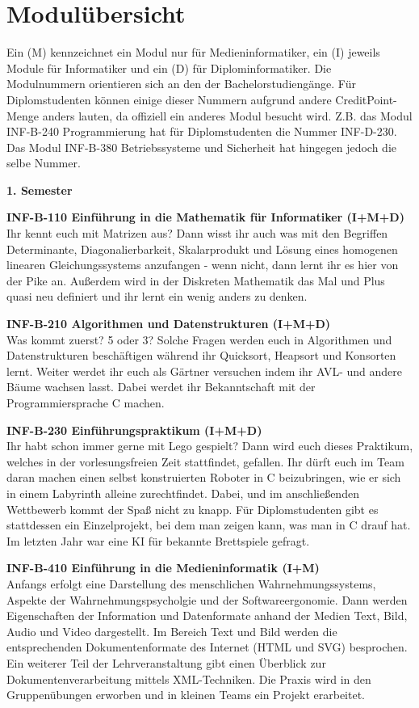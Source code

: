 \chapter{Modulübersicht}

Ein (M) kennzeichnet ein Modul nur für Medieninformatiker, ein (I) jeweils Module für Informatiker und ein (D) für Diplominformatiker.
Die Modulnummern orientieren sich an den der Bachelorstudiengänge.
Für Diplomstudenten können einige dieser Nummern aufgrund andere CreditPoint-Menge anders lauten, da offiziell ein anderes Modul besucht wird.
Z.B. das Modul INF-B-240 Programmierung hat für Diplomstudenten die Nummer INF-D-230.
Das Modul INF-B-380 Betriebssysteme und Sicherheit hat hingegen jedoch die selbe Nummer.

\textbf{1. Semester}

\textbf{INF-B-110 Einführung in die Mathematik für Informatiker (I+M+D)} \\
Ihr kennt euch mit Matrizen aus?
Dann wisst ihr auch was mit den Begriffen Determinante, Diagonalierbarkeit, Skalarprodukt und Lösung eines homogenen linearen Gleichungssystems anzufangen - wenn nicht, dann lernt ihr es hier von der Pike an.
Außerdem wird in der Diskreten Mathematik das Mal und Plus quasi neu definiert und ihr lernt ein wenig anders zu denken.

\textbf{INF-B-210 Algorithmen und Datenstrukturen (I+M+D)} \\
Was kommt zuerst?
5 oder 3?
Solche Fragen werden euch in Algorithmen und Datenstrukturen beschäftigen während ihr Quicksort, Heapsort und Konsorten lernt.
Weiter werdet ihr euch als Gärtner versuchen indem ihr AVL- und andere Bäume wachsen lasst.
Dabei werdet ihr Bekanntschaft mit der Programmiersprache C machen.

\textbf{INF-B-230 Einführungspraktikum (I+M+D)} \\
Ihr habt schon immer gerne mit Lego gespielt?
Dann wird euch dieses Praktikum, welches in der vorlesungsfreien Zeit stattfindet, gefallen.
Ihr dürft euch im Team daran machen einen selbst konstruierten Roboter in C beizubringen, wie er sich in einem Labyrinth alleine zurechtfindet.
Dabei, und im anschließenden Wettbewerb kommt der Spaß nicht zu knapp.
Für Diplomstudenten gibt es stattdessen ein Einzelprojekt, bei dem man zeigen kann, was man in C drauf hat.
Im letzten Jahr war eine KI für bekannte Brettspiele gefragt.

\textbf{INF-B-410 Einführung in die Medieninformatik (I+M)} \\
Anfangs erfolgt eine Darstellung des menschlichen Wahrnehmungssystems, Aspekte der Wahrnehmungspsycholgie und der Softwareergonomie.
Dann werden Eigenschaften der Information und Datenformate anhand der Medien Text, Bild, Audio und Video dargestellt.
Im Bereich Text und Bild werden die entsprechenden Dokumentenformate des Internet (HTML und SVG) besprochen.
Ein weiterer Teil der Lehrveranstaltung gibt einen Überblick zur Dokumentenverarbeitung mittels XML-Techniken.
Die Praxis wird in den Gruppenübungen erworben und in kleinen Teams ein Projekt erarbeitet.

